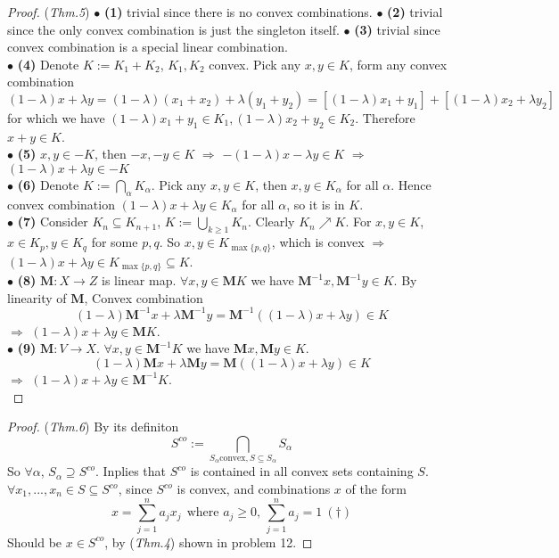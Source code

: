 \documentclass[a4paper, 10pt]{article}
\theoremstyle{definition}
\theoremstyle{hSol}
\begin{document}
\begin{proof} (\textit{Thm.5}) $\bullet$ \textbf{(1)} trivial since there is no convex combinations. $\bullet$ \textbf{(2)} trivial since the only convex combination is just the singleton itself. $\bullet$ \textbf{(3)} trivial since convex combination is a special linear combination. \\
$\bullet$ \textbf{(4)} Denote $K:=K_1+K_2$, $K_1, K_2$ convex. Pick any $x, y\in K$, form any convex combination $(1-\lambda)x+\lambda y=(1-\lambda)(x_1+x_2)+\lambda(y_1+y_2)=[(1-\lambda)x_1+y_1]+[(1-\lambda)x_2+\lambda y_2]$ for which we have $(1-\lambda)x_1+y_1\in K_1, (1-\lambda)x_2+y_2\in K_2$. Therefore $x+y\in K$.\\
$\bullet$ \textbf{(5)} $x,y\in-K$, then $-x,-y \in K$ $\Rightarrow$ $-(1- \lambda)x-\lambda y \in K$ $\Rightarrow$ $(1- \lambda)x+\lambda y \in -K$\\
$\bullet$ \textbf{(6)} Denote $K:=\bigcap_{\alpha}K_{\alpha}$. Pick any $x,y\in K$, then $x,y\in K_{\alpha}$ for all $\alpha$. Hence convex combination $(1-\lambda)x+\lambda y \in K_{\alpha}$ for all $\alpha$, so it is in $K$.\\
$\bullet$ \textbf{(7)} Consider $K_n \subseteq K_{n+1}$, $K:=\bigcup_{k\geq 1} K_n$. Clearly $K_n \nearrow K$. For $x,y\in K$, $x\in K_p, y\in K_q$ for some $p,q$. So $x,y \in K_{\max{\{p,q\}}}$, which is convex $\Rightarrow$ $(1- \lambda)x+\lambda y\in K_{\max{\{p,q\}}} \subseteq K$.\\
$\bullet$ \textbf{(8)} $\bm{M}: X \to Z$ is linear map. $\forall x,y \in \bm{M}K$ we have $\bm{M}^{-1}x, \bm{M}^{-1}y \in K$. By linearity of $\bm{M}$, Convex combination
\begin{equation}
  (1- \lambda)\bm{M}^{-1}x + \lambda \bm{M}^{-1}y = \bm{M}^{-1}((1- \lambda)x + \lambda y) \in K
\end{equation}
$\Rightarrow$ $(1- \lambda)x + \lambda y \in \bm{M}K$.\\
$\bullet$ \textbf{(9)} $\bm{M}: V \to X$. $\forall x,y \in \bm{M}^{-1}K$ we have $\bm{M}x, \bm{M}y \in K$.
\begin{equation}
  (1- \lambda)\bm{M}x + \lambda \bm{M}y = \bm{M}((1- \lambda)x + \lambda y) \in K
\end{equation}
$\Rightarrow$ $(1- \lambda)x + \lambda y \in \bm{M}^{-1}K$.\\
\end{proof} 

\begin{proof} (\textit{Thm.6}) By its definiton
\begin{equation}
  S^{co}:=\bigcap_{S_{\alpha} \text{convex}, S \subseteq S_{\alpha}} S_{\alpha}
\end{equation}
So $\forall \alpha$, $S_{\alpha} \supseteq S^{co}$. Inplies that $S^{co}$ is contained in all convex sets containing $S$. \\
$\forall x_1, ..., x_n\in S \subseteq S^{co}$, since $S^{co}$ is convex, and combinations $x$ of the form
$$x=\sum_{j=1}^n a_jx_j~~\text{where $a_j\geq 0$, $\sum_{j=1}^n a_j=1$}~(\dag)$$
Should be $x\in S^{co}$, by (\textit{Thm.4}) shown in problem 12.
\end{proof}
\end{document}
